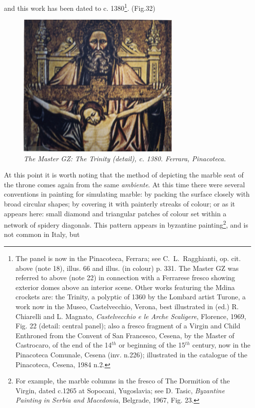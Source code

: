 \documentclass[a4paper,12pt]{article}
\begin{document}
and this work has been dated to c. 1380\footnote{The panel is now in
the Pinacoteca, Ferrara; see C.~L.~Ragghianti, op. cit. above (note
18), illus. 66 and illus. (in colour) p. 331. The Master GZ was
referred to above (note 22) in connection with a Ferrarese fresco
showing exterior domes above an interior scene. Other works featuring
the Mdina crockets are: the Trinity, a polyptic of 1360 by the Lombard
artist Turone, a work now in the Museo, Castelvecchio, Verona, best
illustrated in (ed.) R. Chiarelli and L. Magnato,
\textit{Castelvecchio e le Arche Scaligere}, Florence, 1969, Fig. 22
(detail: central panel); also a fresco fragment of a Virgin and Child
Enthroned from the Convent of San Francesco, Cesena, by the Master of
Castrocaro, of the end of the 14$^{th}$ or beginning of the 15$^{th}$
century, now in the Pinacoteca Comunale, Cesena (inv. n.226);
illustrated in the catalogue of the Pinacoteca, Cesena, 1984
n.2.}. (Fig.32) 
\begin{figure}[htbp]
\centering
\includegraphics[width=8cm]{pics/fig32.png}
\caption[The Master GZ: The Trinity (detail)] 
{\it The Master GZ: The Trinity (detail), c. 1380.  Ferrara, Pinacoteca.}
\end{figure}
At this point it is worth noting that the method of
depicting the marble seat of the throne comes again from the same
\textit{ambiente}.  At this time there were several conventions in
painting for simulating marble: by packing the surface closely with
broad circular shapes; by covering it with painterly streaks of
colour; or as it appears here: small diamond and triangular patches of
colour set within a network of spidery diagonals. This pattern appears
in byzantine painting\footnote{For example, the marble columns in the
fresco of The Dormition of the Virgin, dated c.1265 at Sopocani,
Yugoslavia; see D. Tasic,\textit{ Byzantine Painting in Serbia and
Macedonia}, Belgrade, 1967, Fig. 23.}, and is not common in Italy, but
\end{document}
